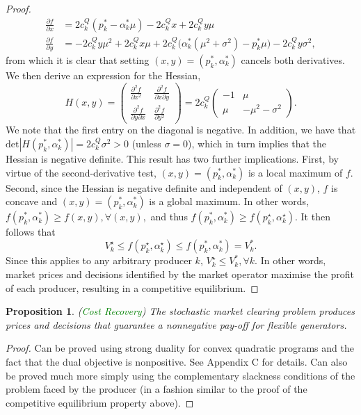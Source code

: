 \documentclass{article}
\newtheorem{proposition}{Proposition}
\begin{document}
\begin{proof}
\begin{align*}
\frac{\partial f}{\partial x} &= 2c_k^Q(p_k^* - \alpha_k^*\mu) - 2 c_k^Q x + 2c_k^Q y \mu\\
\frac{\partial f}{\partial y} &= - 2c_k^Q y \mu^2 + 2 c_k^Q x \mu + 2c_k^Q\big(\alpha_k^*(\mu^2 + \sigma^2) - p_k^* \mu\big) - 2c_k^Q y \sigma^2,
\end{align*}
from which it is clear that setting $(x, y) = (p_k^*, \alpha_k^*)$ cancels both derivatives. We then derive an expression for the Hessian,
\begin{equation*}
H(x,y) = \begin{pmatrix} \frac{\partial^2 f}{\partial x^2} & \frac{\partial^2 f}{\partial x \partial y} \\ \frac{\partial^2 f}{\partial y \partial x} & \frac{\partial^2 f}{\partial y^2} \end{pmatrix} = 2c_k^Q \begin{pmatrix} -1 & \mu \\ \mu & -\mu^2 - \sigma^2 \end{pmatrix}.
\end{equation*}
We note that the first entry on the diagonal is negative. In addition, we have that $\mbox{det}|H(p_k^*, \alpha_k^*)| = 2 c_k^Q \sigma^2 > 0$ (unless $\sigma = 0$), which in turn implies that the Hessian is negative definite. This result has two further implications. First, by virtue of the second-derivative test, $(x, y) = (p_k^*, \alpha_k^*)$ is a local maximum of $f$. Second, since the Hessian is negative definite and independent of $(x, y)$, $f$ is concave and $(x, y) = (p_k^*, \alpha_k^*)$ is a global maximum. In other words, $f(p_k^*, \alpha_k^*) \ge f(x, y), \forall (x, y),$ and thus $f(p_k^*, \alpha_k^*) \ge f(p_k^\star, \alpha_k^\star)$. It then follows that
\begin{equation*}
V_k^\star \le f(p_k^\star, \alpha_k^\star) \le f(p_k^*, \alpha_k^*) = V_k^*.
\end{equation*}
Since this applies to any arbitrary producer $k$, $V_k^\star \le V_k^*, \forall k$. In other words, market prices and decisions identified by the market operator maximise the profit of each producer, resulting in a competitive equilibrium.
\end{proof}

\begin{proposition}
(\textcolor{green}{Cost Recovery}) The stochastic market clearing problem produces prices and decisions that guarantee a nonnegative pay-off for flexible generators.
\end{proposition}
\begin{proof}
Can be proved using strong duality for convex quadratic programs and the fact that the dual objective is nonpositive. See Appendix C for details. Can also be proved much more simply using the complementary slackness conditions of the problem faced by the producer (in a fashion similar to the proof of the competitive equilibrium property above). 
\end{proof}
\end{document}

